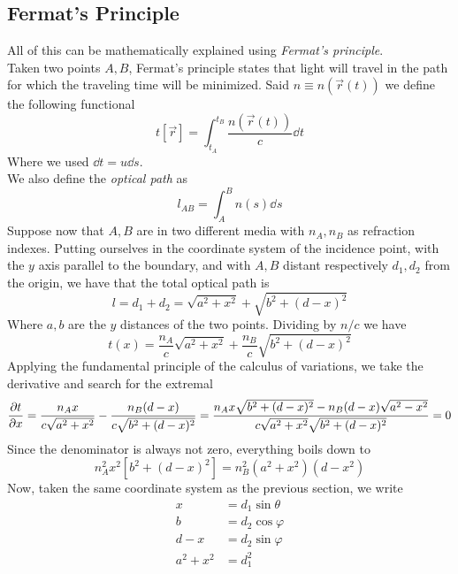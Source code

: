 \documentclass[../electromagnetism.tex]{subfiles}
\begin{document}
\subsection{Fermat's Principle}
All of this can be mathematically explained using \textit{Fermat's principle}.\\
Taken two points $A, B$, Fermat's principle states that light will travel in the path for which the traveling time will be minimized. Said $n\equiv n\left( \vec{r}(t) \right)$ we define the following functional
\begin{equation}
	t\left[ \vec{r} \right]=\int_{t_A}^{t_B}\frac{n\left( \vec{r}(t) \right)}{c}\dd^{}{t}
	\label{eq:time.fermat}
\end{equation}
Where we used $\dd t=u\dd s$.\\
We also define the \textit{optical path} as
\begin{equation}
	l_{AB}=\int_{A}^{B}n(s)\dd^{}{s}
	\label{eq:optpath.ref}
\end{equation}
Suppose now that $A, B$ are in two different media with $n_A, n_B$ as refraction indexes. Putting ourselves in the coordinate system of the incidence point, with the $y$ axis parallel to the boundary, and with $A, B$ distant respectively $d_1, d_2$ from the origin, we have that the total optical path is
\begin{equation*}
	l=d_1+d_2=\sqrt{a^2+x^2}+\sqrt{b^2+(d-x)^2}
\end{equation*}
Where $a, b$ are the $y$ distances of the two points. Dividing by $n/c$ we have
\begin{equation*}
	t(x)=\frac{n_A}{c}\sqrt{a^2+x^2}+\frac{n_B}{c}\sqrt{b^2+(d-x)^2}
\end{equation*}
Applying the fundamental principle of the calculus of variations, we take the derivative and search for the extremal
\begin{equation*}
	\pdv{t}{x}=\frac{n_Ax}{c\sqrt{a^2+x^2}}-\frac{n_B(d-x)}{c\sqrt{b^2+(d-x)^2}}=\frac{n_Ax\sqrt{b^2+(d-x)^2}-n_B(d-x)\sqrt{a^2-x^2}}{c\sqrt{a^2+x^2}\sqrt{b^2+(d-x)^2}}=0
\end{equation*}
Since the denominator is always not zero, everything boils down to
\begin{equation*}
	n_A^2x^2\left[ b^2+(d-x)^2 \right]=n_B^2(a^2+x^2)(d-x^2)
\end{equation*}
Now, taken the same coordinate system as the previous section, we write
\begin{equation*}
	\begin{aligned}
		x&= d_1\sin\theta\\
		b&= d_2\cos\varphi\\
		d-x&= d_2\sin\varphi\\
		a^2+x^2&= d_1^2
	\end{aligned}
\end{equation*}
\end{document}
